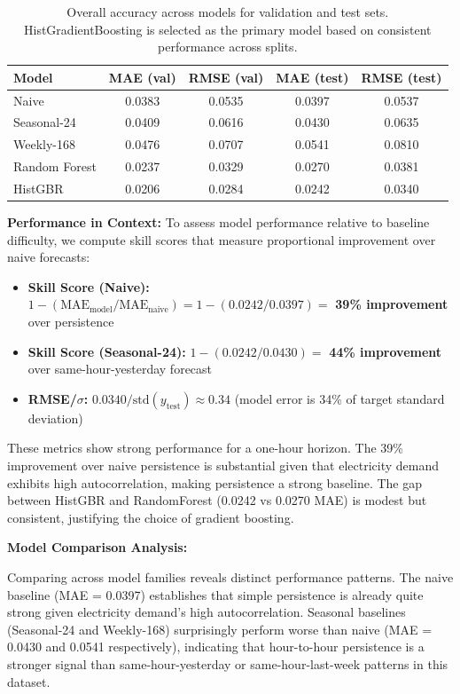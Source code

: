 \documentclass[11pt,a4paper]{article}
\begin{document}
\begin{table}[H]
  \centering
  \begin{tabular}{lcccc}
    \hline
    Model & MAE (val) & RMSE (val) & MAE (test) & RMSE (test) \\ \hline
    Naive & 0.0383 & 0.0535 & 0.0397 & 0.0537 \\
    Seasonal-24 & 0.0409 & 0.0616 & 0.0430 & 0.0635 \\
    Weekly-168 & 0.0476 & 0.0707 & 0.0541 & 0.0810 \\
    Random Forest & 0.0237 & 0.0329 & 0.0270 & 0.0381 \\
    HistGBR & 0.0206 & 0.0284 & 0.0242 & 0.0340 \\
    \hline
  \end{tabular}
  \caption{Overall accuracy across models for validation and test sets. HistGradientBoosting is selected as the primary model based on consistent performance across splits.}
\end{table}

\textbf{Performance in Context:}
To assess model performance relative to baseline difficulty, we compute skill scores that measure proportional improvement over naive forecasts:
\begin{itemize}[leftmargin=*]
  \item \textbf{Skill Score (Naive):} $1 - (\text{MAE}_{\text{model}} / \text{MAE}_{\text{naive}}) = 1 - (0.0242/0.0397) = $ \textbf{39\% improvement} over persistence
  \item \textbf{Skill Score (Seasonal-24):} $1 - (0.0242/0.0430) = $ \textbf{44\% improvement} over same-hour-yesterday forecast
  \item \textbf{RMSE/$\sigma$:} $0.0340 / \text{std}(y_{\text{test}}) \approx 0.34$ (model error is 34\% of target standard deviation)
\end{itemize}

These metrics show strong performance for a one-hour horizon. The 39\% improvement over naive persistence is substantial given that electricity demand exhibits high autocorrelation, making persistence a strong baseline. The gap between HistGBR and RandomForest (0.0242 vs 0.0270 MAE) is modest but consistent, justifying the choice of gradient boosting.

\textbf{Model Comparison Analysis:}

Comparing across model families reveals distinct performance patterns. The naive baseline (MAE = 0.0397) establishes that simple persistence is already quite strong given electricity demand's high autocorrelation. Seasonal baselines (Seasonal-24 and Weekly-168) surprisingly perform worse than naive (MAE = 0.0430 and 0.0541 respectively), indicating that hour-to-hour persistence is a stronger signal than same-hour-yesterday or same-hour-last-week patterns in this dataset.
\end{document}

